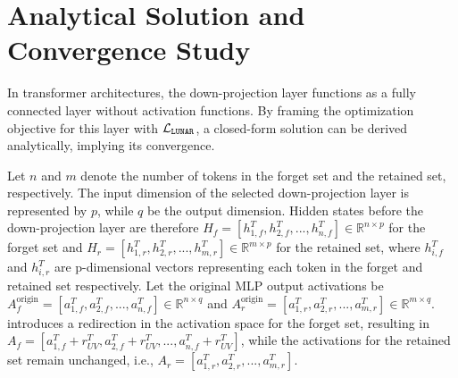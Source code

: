 %

% 


\section{Analytical Solution and Convergence Study}
In transformer architectures, the down-projection layer functions as a fully connected layer without activation functions. By framing the optimization objective for this layer with \(\mathcal{L}_\text{\texttt{LUNAR}}\), a closed-form solution can be derived analytically, implying its convergence. 

Let \( n \) and \( m \) denote the number of tokens in the forget set and the retained set, respectively. The input dimension of the selected down-projection layer is represented by \( p \), while \( q \) be the output dimension. Hidden states before the down-projection layer are therefore \( H_f = [h_{1,f}^T, h_{2,f}^T, ..., h_{n,f}^T] \in \mathbb{R}^{n \times p}\) for the forget set and \( H_r = [h_{1,r}^T, h_{2,r}^T, ..., h_{m,r}^T] \in \mathbb{R}^{m \times p}\) for the retained set, where \( h_{i,f}^T \) and \( h_{i,r}^T \) are p-dimensional vectors representing each token in the forget and retained set respectively. Let the original MLP output activations be \( A_f^{\text{origin}} = [a_{1,f}^T, a_{2,f}^T, ..., a_{n,f}^T] \in \mathbb{R}^{n \times q} \) and \( A_r^{\text{origin}} = [a_{1,r}^T, a_{2,r}^T, ..., a_{m,r}^T] \in \mathbb{R}^{m \times q} \). \lunar introduces a redirection in the activation space for the forget set, resulting in \( A_f = [a_{1,f}^T + r_{UV}^T, a_{2,f}^T+ r_{UV}^T, ..., a_{n,f}^T+ r_{UV}^T] \), while the activations for the retained set remain unchanged, i.e., \( A_r = [a_{1,r}^T, a_{2,r}^T, ..., a_{m,r}^T]  \).


